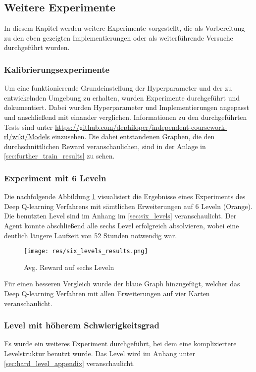 \documentclass[11pt]{scrartcl}
\begin{document}
\subsection{Weitere Experimente}
In diesem Kapitel werden weitere Experimente vorgestellt, die als Vorbereitung zu den eben
gezeigten Implementierungen oder als weiterführende Versuche durchgeführt wurden.

\subsubsection{Kalibrierungsexperimente}
\label{sec:calibration_experiments}
Um eine funktionierende Grundeinstellung der Hyperparameter und der zu entwickelnden
Umgebung zu erhalten, wurden Experimente durchgeführt und dokumentiert. Dabei wurden
Hyperparameter und Implementierungen angepasst und anschließend mit einander verglichen.
Informationen zu den durchgeführten Tests sind unter
\url{https://github.com/dephiloper/independent-coursework-rl/wiki/Models} einzusehen. Die
dabei entstandenen Graphen, die den durchschnittlichen Reward veranschaulichen, sind in
der Anlage in \autoref{sec:further_train_results} zu sehen.

\subsubsection{Experiment mit 6 Leveln}
Die nachfolgende Abbildung \ref{fig:six_levels_results} visualisiert die Ergebnisse
eines Experiments des Deep Q-learning Verfahrens mit sämtlichen Erweiterungen auf 6 Leveln
(Orange). Die benutzten Level sind im Anhang im \autoref{sec:six_levels} veranschaulicht. 
Der Agent konnte abschließend alle sechs Level erfolgreich absolvieren, wobei eine deutlich
längere Laufzeit von 52 Stunden notwendig war.

\begin{figure}[htp]
\centering
\texttt{[image: res/six\_levels\_results.png]}
\caption{Avg. Reward auf sechs Leveln}
\label{fig:six_levels_results}
\end{figure}

Für einen besseren Vergleich wurde der blaue Graph hinzugefügt, welcher das Deep Q-learning
Verfahren mit allen Erweiterungen auf vier Karten veranschaulicht.

\subsubsection{Level mit höherem Schwierigkeitsgrad}
\label{sec:hard_level}
Es wurde ein weiteres Experiment durchgeführt, bei dem eine kompliziertere Levelstruktur
benutzt wurde. Das Level wird im Anhang unter \ref{sec:hard_level_appendix} veranschaulicht.
\end{document}
